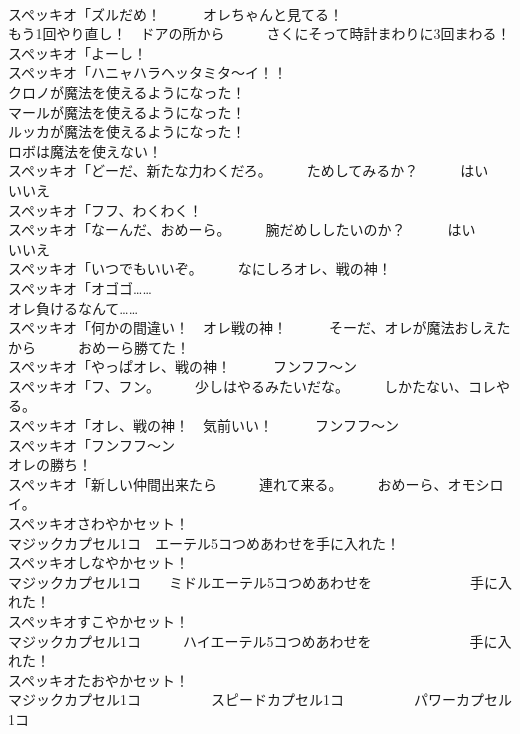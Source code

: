 \documentclass[8pt]{extreport}
\begin{document}
\begin{CJK}{UTF8}{min}
\\	スペッキオ「ズルだめ！　　　オレちゃんと見てる！	
\\	もう1回やり直し！　ドアの所から　　　さくにそって時計まわりに3回まわる！	
\\	スペッキオ「よーし！	
\\	スペッキオ「ハニャハラヘッタミタ～イ！！	
\\	クロノが魔法を使えるようになった！	
\\	マールが魔法を使えるようになった！	
\\	ルッカが魔法を使えるようになった！	
\\	ロボは魔法を使えない！	
\\	スペッキオ「どーだ、新たな力わくだろ。　　　ためしてみるか？　　　はい　　　いいえ	
\\	スペッキオ「フフ、わくわく！	
\\	スペッキオ「なーんだ、おめーら。　　　腕だめししたいのか？　　　はい　　　いいえ	
\\	スペッキオ「いつでもいいぞ。　　　なにしろオレ、戦の神！	
\\	スペッキオ「オゴゴ……	
\\	オレ負けるなんて……	
\\	スペッキオ「何かの間違い！　オレ戦の神！　　　そーだ、オレが魔法おしえたから　　　おめーら勝てた！	
\\	スペッキオ「やっぱオレ、戦の神！　　　フンフフ～ン
\\	スペッキオ「フ、フン。　　　少しはやるみたいだな。　　　しかたない、コレやる。	
\\	スペッキオ「オレ、戦の神！　気前いい！　　　フンフフ～ン
\\	スペッキオ「フンフフ～ン
\\	オレの勝ち！	
\\	スペッキオ「新しい仲間出来たら　　　連れて来る。　　　おめーら、オモシロイ。	
\\	スペッキオさわやかセット！	
\\	マジックカプセル1コ　エーテル5コつめあわせを手に入れた！	
\\	スペッキオしなやかセット！	
\\	マジックカプセル1コ　　ミドルエーテル5コつめあわせを　　　　　　　手に入れた！	
\\	スペッキオすこやかセット！	
\\	マジックカプセル1コ　　　ハイエーテル5コつめあわせを　　　　　　　手に入れた！	
\\	スペッキオたおやかセット！	
\\	マジックカプセル1コ　　　　　スピードカプセル1コ　　　　　パワーカプセル　1コ	

\end{CJK}
\end{document}
